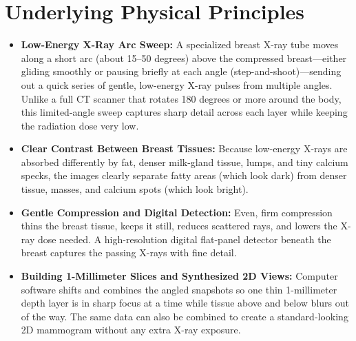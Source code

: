 \section{Underlying Physical Principles}
\begin{itemize}
\item \textbf{Low-Energy X-Ray Arc Sweep:} A specialized breast X-ray tube moves along a short arc (about 15--50 degrees) above the compressed breast---either gliding smoothly or pausing briefly at each angle (step-and-shoot)---sending out a quick series of gentle, low-energy X-ray pulses from multiple angles. Unlike a full CT scanner that rotates 180 degrees or more around the body, this limited-angle sweep captures sharp detail across each layer while keeping the radiation dose very low.
\item \textbf{Clear Contrast Between Breast Tissues:} Because low-energy X-rays are absorbed differently by fat, denser milk-gland tissue, lumps, and tiny calcium specks, the images clearly separate fatty areas (which look dark) from denser tissue, masses, and calcium spots (which look bright).
\item \textbf{Gentle Compression and Digital Detection:} Even, firm compression thins the breast tissue, keeps it still, reduces scattered rays, and lowers the X-ray dose needed. A high-resolution digital flat-panel detector beneath the breast captures the passing X-rays with fine detail.
\item \textbf{Building 1-Millimeter Slices and Synthesized 2D Views:} Computer software shifts and combines the angled snapshots so one thin 1-millimeter depth layer is in sharp focus at a time while tissue above and below blurs out of the way. The same data can also be combined to create a standard-looking 2D mammogram without any extra X-ray exposure.
\end{itemize}

